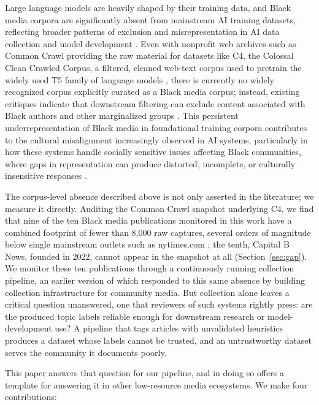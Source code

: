 \documentclass[letterpaper]{article}
\begin{document}
Large language models are heavily shaped by their training data, and
Black media corpora are significantly absent from mainstream AI training
datasets, reflecting broader patterns of exclusion and misrepresentation
in AI data collection and model development \citep{bender2021}. Even
with nonprofit web archives such as Common Crawl \citep{baack2024}
providing the raw material for datasets like C4, the Colossal Clean
Crawled Corpus, a filtered, cleaned web-text corpus used to pretrain the
widely used T5 family of language models \citep{raffel2020}, there is
currently no widely recognized corpus explicitly curated as a Black
media corpus; instead, existing critiques indicate that downstream
filtering can exclude content associated with Black authors and other
marginalized groups \citep{baack2024}. This persistent
underrepresentation of Black media in foundational training corpora
contributes to the cultural misalignment increasingly observed in AI
systems, particularly in how these systems handle socially sensitive
issues affecting Black communities, where gaps in representation can
produce distorted, incomplete, or culturally insensitive responses
\citep{tao2024}.

The corpus-level absence described above is not only asserted in the
literature; we measure it directly. Auditing the Common Crawl snapshot
underlying C4, we find that nine of the ten Black media publications
monitored in this work have a combined footprint of fewer than 8,000 raw
captures, several orders of magnitude below single mainstream outlets
such as nytimes.com \citep{dodge2021}; the tenth, Capital B News,
founded in 2022, cannot appear in the snapshot at all
(Section~\ref{sec:gap}). We monitor these ten publications through a
continuously running collection pipeline, an earlier version of which
responded to this same absence by building collection infrastructure
for community media. But collection alone leaves a critical question
unanswered, one that reviewers of such systems rightly press: are the
produced topic labels reliable enough for downstream research or
model-development use? A pipeline that tags articles with unvalidated
heuristics produces a dataset whose labels cannot be trusted, and an
untrustworthy dataset serves the community it documents poorly.

This paper answers that question for our pipeline, and in doing so
offers a template for answering it in other low-resource media
ecosystems. We make four contributions:
\end{document}

